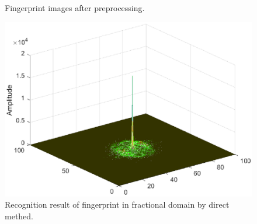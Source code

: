 \documentclass[conference]{IEEEtran}
\begin{document}
\begin{figure}[t]
	\centering
	\caption{{Fingerprint images after preprocessing.}}  %
	\label{finger}
\end{figure}

\begin{figure}[t]
	\centering
	\includegraphics[width = 65 mm]{fig/finger_FRFD.eps}
	\caption{Recognition result of fingerprint in fractional domain by direct methed.}
	\label{result by direct} 
\end{figure}
\end{document}
